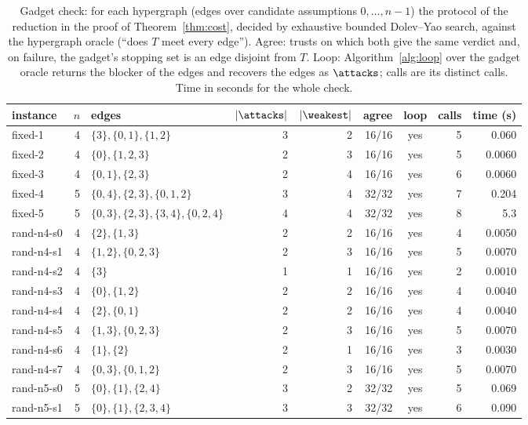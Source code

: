 \begin{table}[tbp]
\caption{Gadget check: for each hypergraph (edges over candidate assumptions $0, \dots, n-1$) the protocol of the reduction in the proof of Theorem~\ref{thm:cost}, decided by exhaustive bounded Dolev--Yao search, against the hypergraph oracle (``does $T$ meet every edge''). Agree: trusts on which both give the same verdict and, on failure, the gadget's stopping set is an edge disjoint from $T$. Loop: Algorithm~\ref{alg:loop} over the gadget oracle returns the blocker of the edges and recovers the edges as $\attacks$; calls are its distinct calls. Time in seconds for the whole check.}
\label{tab:gadget}
\centering
\setlength{\tabcolsep}{3pt}
\scriptsize
\begin{tabular}{l r l r r r c r r}
\toprule
instance & $n$ & edges & $|\attacks|$ & $|\weakest|$ & agree & loop & calls & time (s)\\
\midrule
fixed-1 & 4 & $\{3\}, \{0,1\}, \{1,2\}$ & 3 & 2 & 16/16 & yes & 5 & 0.060\\
fixed-2 & 4 & $\{0\}, \{1,2,3\}$ & 2 & 3 & 16/16 & yes & 5 & 0.0060\\
fixed-3 & 4 & $\{0,1\}, \{2,3\}$ & 2 & 4 & 16/16 & yes & 6 & 0.0060\\
fixed-4 & 5 & $\{0,4\}, \{2,3\}, \{0,1,2\}$ & 3 & 4 & 32/32 & yes & 7 & 0.204\\
fixed-5 & 5 & $\{0,3\}, \{2,3\}, \{3,4\}, \{0,2,4\}$ & 4 & 4 & 32/32 & yes & 8 & 5.3\\
rand-n4-s0 & 4 & $\{2\}, \{1,3\}$ & 2 & 2 & 16/16 & yes & 4 & 0.0050\\
rand-n4-s1 & 4 & $\{1,2\}, \{0,2,3\}$ & 2 & 3 & 16/16 & yes & 5 & 0.0070\\
rand-n4-s2 & 4 & $\{3\}$ & 1 & 1 & 16/16 & yes & 2 & 0.0010\\
rand-n4-s3 & 4 & $\{0\}, \{1,2\}$ & 2 & 2 & 16/16 & yes & 4 & 0.0040\\
rand-n4-s4 & 4 & $\{2\}, \{0,1\}$ & 2 & 2 & 16/16 & yes & 4 & 0.0040\\
rand-n4-s5 & 4 & $\{1,3\}, \{0,2,3\}$ & 2 & 3 & 16/16 & yes & 5 & 0.0070\\
rand-n4-s6 & 4 & $\{1\}, \{2\}$ & 2 & 1 & 16/16 & yes & 3 & 0.0030\\
rand-n4-s7 & 4 & $\{0,3\}, \{0,1,2\}$ & 2 & 3 & 16/16 & yes & 5 & 0.0070\\
rand-n5-s0 & 5 & $\{0\}, \{1\}, \{2,4\}$ & 3 & 2 & 32/32 & yes & 5 & 0.069\\
rand-n5-s1 & 5 & $\{0\}, \{1\}, \{2,3,4\}$ & 3 & 3 & 32/32 & yes & 6 & 0.090\\

\end{tabular}
\end{table}
